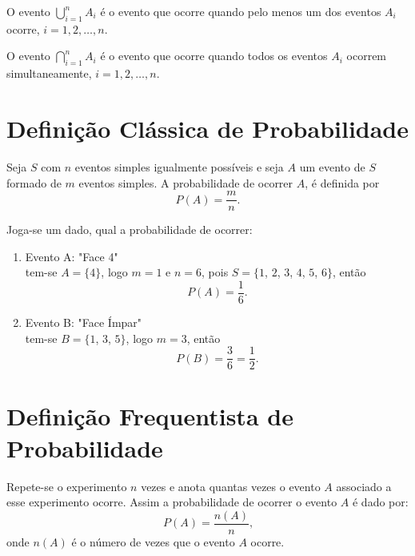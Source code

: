 \documentclass[11pt,fleqn]{book}
\numberwithin{mpicture}{chapter}
\numberwithin{mtable}{chapter}
\numberwithin{mframe}{chapter}
\begin{document}
\begin{definition}
	O evento $\displaystyle\bigcup_{i=1}^{n} A_i$ é o evento que ocorre quando pelo menos um dos eventos $A_i$ ocorre, $i=1,2,\dots, n$.
\end{definition}

\begin{definition}
	O evento $\displaystyle\bigcap_{i=1}^{n} A_i$ é o evento que ocorre quando todos os eventos $A_i$ ocorrem simultaneamente, $i=1,2,\dots, n$.
\end{definition}

\section{Definição Clássica de Probabilidade}

Seja $S$ com $n$ eventos simples igualmente possíveis e seja $A$ um evento de $S$ formado de $m$ eventos simples. A probabilidade de ocorrer $A$, é definida por
\begin{equation}
	P(A)=\frac{m}{n}\text{.}
\end{equation}

\begin{example}
	Joga-se um dado, qual a probabilidade de ocorrer:
	\begin{enumerate}[label=\alph*)]
		\item Evento A: "Face 4"\\
		
		tem-se $A=\{4\}$, logo $m=1$ e $n=6$, pois $S=\{1$, $2$, $3$, $4$, $5$, $6\}$, então
		\[
			P(A)=\frac{1}{6}\text{.}
		\]
		
		\item Evento B: "Face Ímpar"\\
		
		tem-se $B=\{1$, $3$, $5\}$, logo $m=3$, então
		\[
			P(B)=\frac{3}{6}=\frac{1}{2}\text{.}
		\]
	\end{enumerate}
\end{example}

\section{Definição Frequentista de Probabilidade}

Repete-se o experimento $n$ vezes e anota quantas vezes o evento $A$ associado a esse experimento ocorre. Assim a probabilidade de ocorrer o evento $A$ é dado por:
\begin{equation}
	P(A)=\frac{n(A)}{n}\text{,}
\end{equation}
onde $n(A)$ é o número de vezes que o evento $A$ ocorre.
\end{document}
